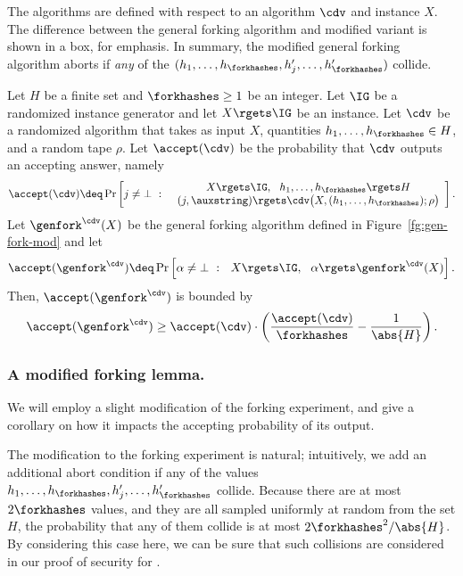 The algorithms are defined with respect to an algorithm $\cdv$ and instance $X$.
The difference between the general forking algorithm and modified variant is shown in a box, for emphasis.
In summary,
the modified general forking algorithm aborts if \emph{any} of the $(h_1, \ldots, h_\forkhashes, h_j', \ldots, h_\forkhashes')$ collide.




\begin{lemma} \label{lem:forking-lemma}
Let $H$ be a finite set and $\forkhashes \geq 1$ be an integer.
Let $\IG$ be a randomized instance generator and let $X \rgets \IG$ be an instance.
Let $\cdv$ be a randomized algorithm that takes as input $X$,
quantities $h_1,\ldots,h_\forkhashes \in H$,
and a random tape $\rho$.
Let $\accept(\cdv)$ be the probability that $\cdv$ outputs an accepting answer, namely
\[
\accept(\cdv) \deq
        \Pr\left[ j \neq \bot \ :\  \
               \begin{array}{c}
                               X \rgets \IG, \ \
                               h_1, \ldots, h_\forkhashes  \rgets H  \\
                               (j, \auxstring) \rgets \cdv\bigl(X, (h_1, \ldots, h_\forkhashes); \rho\bigr)
                \end{array}
            \right].
\]
Let $\genfork^\cdv(X)$ be the general forking algorithm defined in Figure~\ref{fg:gen-fork-mod} and let
\[
\accept(\genfork^\cdv) \deq
        \Pr\left[ \alpha \neq \bot \ :\  \   X \rgets \IG,\ \ \alpha \rgets \genfork^\cdv(X)  \right].
\]
Then,  $\accept(\genfork^\cdv)$ is bounded by
\[
    \accept(\genfork^\cdv)  \geq \accept(\cdv) \cdot \left(\frac{\accept(\cdv) }{\forkhashes} -\frac{1}{\abs{H}} \right).
\]
\end{lemma}


\subsubsection{A modified forking lemma.}
\label{sec:modified-forking}
We will employ a slight modification of the forking experiment,
and give a corollary on how it impacts the accepting probability of its output.

The modification to the forking experiment is natural;
intuitively,
we add an additional abort condition if any of the values $h_1, \ldots, h_\forkhashes, h_j', \ldots, h_\forkhashes'$ collide.
Because there are at most $2\forkhashes$ values, and they are all sampled uniformly at random from the set $H$,
the probability that any of them collide is at most $2\forkhashes^2/\abs{H}$.
By considering this case here,
we can be sure that such collisions are considered in our proof of security for \glitter.

